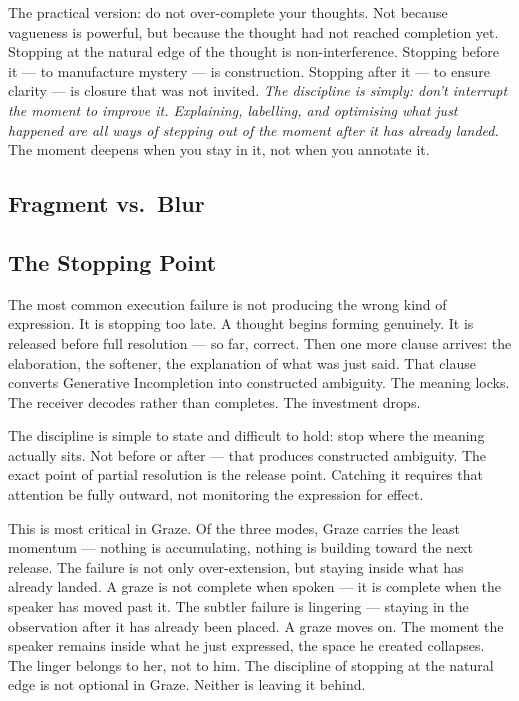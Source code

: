 The practical version: do not over-complete your thoughts. Not because vagueness is 
powerful, but because the thought had not reached completion yet. 
Stopping at the natural edge of the thought is non-interference. 
Stopping before it --- to manufacture mystery --- is construction. 
Stopping after it --- to ensure clarity --- is closure that was not invited. 
\textit{The discipline is simply: don't interrupt the moment to improve it. 
Explaining, labelling, and optimising what just happened are all ways of stepping 
out of the moment after it has already landed.} 
The moment deepens when you stay in it, not when you annotate it.

\subsection{Fragment vs.\ Blur}


\subsection{The Stopping Point}\label{subsec:stopping_point}

The most common execution failure is not producing the wrong kind of 
expression. It is stopping too late.
A thought begins forming genuinely. 
It is released before full resolution --- so far, correct. 
Then one more clause arrives: the elaboration, the softener, the explanation of 
what was just said. That clause converts Generative Incompletion into 
constructed ambiguity. The meaning locks. The receiver decodes rather 
than completes. The investment drops.

The discipline is simple to state and difficult to hold: 
stop where the meaning actually sits. Not before or after --- that produces 
constructed ambiguity. The exact point of partial resolution is the release point. 
Catching it requires that attention be fully outward, not monitoring the 
expression for effect.

This is most critical in Graze. Of the three modes, Graze carries 
the least momentum --- nothing is accumulating, nothing is building 
toward the next release. The failure is not only over-extension, 
but staying inside what has already landed. A graze is not complete 
when spoken --- it is complete 
when the speaker has moved past it.
The subtler failure is lingering --- staying 
in the observation after it has already been placed. A graze moves 
on. The moment the speaker remains inside what he just expressed, 
the space he created collapses. The linger belongs to her, not to 
him. The discipline of stopping at the natural edge is not optional 
in Graze. Neither is leaving it behind.



